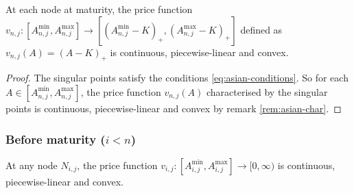 \begin{lmm}
	\label{lmm:asian-pr-maturity}
	At each node at maturity, the price function $ { v_{n,j}: \left[ A_{n,j}^{\min}, A_{n,j}^{\max} \right] \to \left[ ( A_{n,j}^{\min} - K )_+ , ( A_{n,j}^{\max} - K )_+ \right] } $ defined as $ v_{n,j}(A) = (A - K)_+ $ is continuous, piecewise-linear and convex.
\end{lmm}
\begin{proof}
	The singular points satisfy the conditions \ref{eq:asian-conditions}. So for each $ A \in \left[ A_{n,j}^{\min}, A_{n,j}^{\max} \right] $, the price function ${ v_{n,j}(A) }$ characterised by the singular points is continuous, piecewise-linear and convex by remark \ref{rem:asian-char}.
\end{proof}



\subsubsection*{Before maturity ($ i < n $)}

\begin{lmm}
	\label{lmm:asian-dsc-expt}
	At any node $ N_{i,j} $, the price function $ v_{i,j}: \left[ A_{i,j}^{\min}, A_{i,j}^{\max} \right] \to [0, \infty) $ is continuous, piecewise-linear and convex.
\end{lmm}

